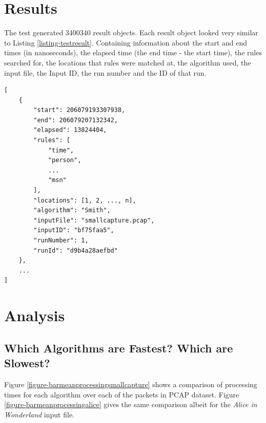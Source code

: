 \documentclass[11pt]{article}
\begin{document}
\section{Results}

The test generated 3400340 result objects. Each result object looked very similar to Listing \ref{listing-testresult}. Containing information about the start and end times (in nanoseconds), the elapsed time (the end time - the start time), the rules searched for, the locations that rules were matched at, the algorithm used, the input file, the Input ID, the run number and the ID of that run.

\begin{lstlisting}[caption = {Sample test Result}, label = {listing-testresult}]
[
    {
        "start": 206079193307938,
        "end": 206079207132342,
        "elapsed": 13824404,
        "rules": [
            "time",
            "person",
            ...
            "msn"
        ],
        "locations": [1, 2, ..., n],
        "algorithm": "Smith",
        "inputFile": "smallcapture.pcap",
        "inputID": "bf75faa5",
        "runNumber": 1,
        "runId": "d9b4a28aefbd"
    },
    ...
]
\end{lstlisting}

\section{Analysis}

\subsection{Which Algorithms are Fastest? Which are Slowest?}

Figure \ref{figure-barmeanprocessingsmallcapture} shows a comparison of processing times for each algorithm over each of the packets in PCAP dataset. Figure \ref{figure-barmeanprocessingalice} gives the same comparison albeit for the \textit{Alice in Wonderland} input file.
\end{document}
